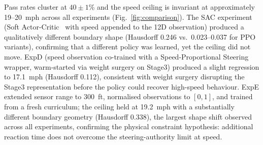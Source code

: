 \documentclass[conference]{IEEEtran}
\begin{document}
\begin{table}[htbp]
\caption{SEMBAS results across completed training experiments. Speed ceiling
is the maximum speed of any PASS point. Hausdorff is relative to Stage3.}
\label{tab:results}
\begin{center}
\end{center}
\end{table}

Pass rates cluster at $40 \pm 1$\% and the speed ceiling is invariant at
approximately 19--20~mph across all experiments (Fig.~\ref{fig:comparison}).
The SAC experiment (Soft Actor-Critic~\cite{b6} with speed appended to the
12D observation) produced a qualitatively different boundary shape (Hausdorff
0.246 vs.\ 0.023--0.037 for PPO variants), confirming that a different policy
was learned, yet the ceiling did not move. ExpD (speed observation co-trained
with a Speed-Proportional Steering wrapper, warm-started via weight surgery on
Stage3) produced a slight regression to 17.1~mph (Hausdorff 0.112), consistent
with weight surgery disrupting the Stage3 representation before the policy
could recover high-speed behaviour. ExpE extended sensor range to 300~ft,
normalised observations to $[0,1]$, and trained from a fresh curriculum; the
ceiling held at 19.2~mph with a substantially different boundary geometry
(Hausdorff 0.338), the largest shape shift observed across all experiments,
confirming the physical constraint hypothesis: additional reaction time does
not overcome the steering-authority limit at speed.
\end{document}
